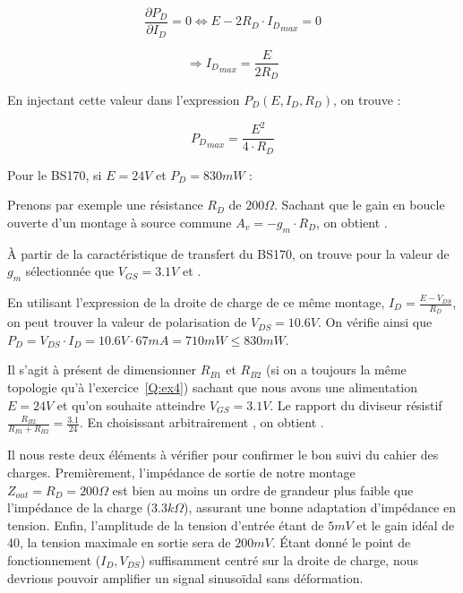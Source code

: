 \documentclass{../../template/tp}
\begin{document}
{	$$\frac{\partial P_D}{\partial I_D}=0 \Longleftrightarrow E-2R_D \cdot {I_D}_{max} = 0$$
	
	$$\Longrightarrow {I_D}_{max}=\frac{E}{2R_D}$$

	En injectant cette valeur dans l'expression $P_D(E, I_D, R_D)$, on trouve : 

	$${P_D}_{max}=\frac{E^2}{4\cdot R_D}$$

	Pour le BS170, si $E = 24 V$ et $P_D=830mW$ :  %

Prenons par exemple une résistance $R_D$ de $200 \Omega$.
Sachant que le gain en boucle ouverte d'un montage à source commune $A_v = - g_m \cdot R_D$, on obtient .

À partir de la caractéristique de transfert du BS170, on trouve pour la valeur de $g_m$ sélectionnée que $V_{GS} = 3.1 V$ et .

En utilisant l'expression de la droite de charge de ce même montage, $I_D = \frac{E - V_{DS}}{R_D}$, on peut trouver la valeur de polarisation de $V_{DS} = 10.6 V$.
On vérifie ainsi que $P_D = V_{DS} \cdot I_D = 10.6 V \cdot 67 mA = 710 mW \leq 830 mW$.

Il s'agit à présent de dimensionner $R_{B1}$ et $R_{B2}$ (si on a toujours la même topologie qu'à l'exercice~\ref{Q:ex4}) sachant que nous avons une alimentation $E = 24 V$ et qu'on souhaite atteindre $V_{GS} = 3.1 V$.
Le rapport du diviseur résistif $\frac{R_{B2}}{R_{B1} + R_{B2}} = \frac{3.1}{24}$.
En choisissant arbitrairement , on obtient .


Il nous reste deux éléments à vérifier pour confirmer le bon suivi du cahier des charges.
Premièrement, l'impédance de sortie de notre montage $Z_{out} = R_D = 200 \Omega$ est bien au moins un ordre de grandeur plus faible que l'impédance de la charge ($3.3 k\Omega$), assurant une bonne adaptation d'impédance en tension.
Enfin, l'amplitude de la tension d'entrée étant de $5 mV$ et le gain idéal de 40, la tension maximale en sortie sera de $200 mV$. Étant donné le point de fonctionnement ($I_D, V_{DS}$) suffisamment centré sur  la droite de charge, nous devrions pouvoir amplifier un signal sinusoïdal sans déformation.


}
\end{document}
